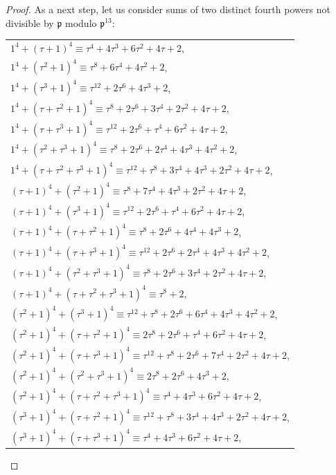 \documentclass[12pt]{article}
\theoremstyle{remark}
\begin{document}
\begin{proof}
As a next step, let us consider sums of two distinct fourth powers not divisible by $\mathfrak{p}$ modulo $\mathfrak{p}^{13}$:
\begin{center}
\begin{tabular}{@{}l@{}}
    $1^4 + (\tau+1)^4 \equiv \tau^4 + 4\tau^3 + 6\tau^2 + 4\tau +2$,\\
    $1^4 + (\tau^2+1)^4 \equiv \tau^8 + 6\tau^4 + 4\tau^2 + 2$,\\
    $1^4 + (\tau^3+1)^4 \equiv \tau^{12} + 2\tau^6 + 4\tau^3 + 2$,\\
    $1^4 + (\tau+\tau^2+1)^4 \equiv \tau^8 + 2\tau^6 + 3\tau^4 + 2\tau^2 + 4\tau + 2$,\\
    $1^4 + (\tau+\tau^3+1)^4 \equiv \tau^{12} + 2\tau^6 + \tau^4 + 6\tau^2 + 4\tau +2$, \\
    $1^4 + (\tau^2+\tau^3+1)^4 \equiv \tau^8+2\tau^6+2\tau^4+4\tau^3+4\tau^2+2$,\\
    $1^4 + (\tau+\tau^2+\tau^3+1)^4 \equiv \tau^{12}+\tau^8+3\tau^4+4\tau^3+2\tau^2+4\tau+2$, \\
    $(\tau+1)^4 + (\tau^2+1)^4 \equiv \tau^8 + 7\tau^4 + 4\tau^3 + 2\tau^2 + 4\tau + 2$, \\
    $(\tau+1)^4 + (\tau^3+1)^4 \equiv \tau^{12} + 2\tau^6 + \tau^4 + 6\tau^2 + 4\tau + 2$, \\
    $(\tau+1)^4 + (\tau+\tau^2+1)^4 \equiv \tau^8 + 2\tau^6 + 4\tau^4 + 4\tau^3 + 2$, \\
    $(\tau+1)^4 + (\tau+\tau^3+1)^4 \equiv \tau^{12}+ 2\tau^6 + 2\tau^4 + 4\tau^3 + 4\tau^2 + 2$, \\
    $(\tau+1)^4 + (\tau^2+\tau^3+1)^4 \equiv \tau^8 + 2\tau^6 + 3\tau^4+2\tau^2+4\tau+2$, \\
    $(\tau+1)^4 + (\tau+\tau^2+\tau^3+1)^4 \equiv \tau^8 + 2$, \\
    $(\tau^2+1)^4 + (\tau^3+1)^4 \equiv \tau^{12}+ \tau^8 + 2\tau^6 + 6\tau^4 + 4\tau^3 + 4\tau^2 + 2$,\\
    $(\tau^2+1)^4 + (\tau+\tau^2+1)^4 \equiv 2\tau^8 + 2\tau^6 + \tau^4 + 6\tau^2 + 4\tau + 2$, \\
    $(\tau^2+1)^4 + (\tau+\tau^3+1)^4 \equiv \tau^{12}+\tau^8+2\tau^6+7\tau^4+2\tau^2+4\tau+2$, \\
    $(\tau^2+1)^4 + (\tau^2+\tau^3+1)^4 \equiv 2\tau^8 + 2\tau^6 + 4\tau^3 + 2$, \\
    $(\tau^2+1)^4 + (\tau+\tau^2+\tau^3+1)^4 \equiv \tau^4+4\tau^3+6\tau^2+4\tau+2$, \\
    $(\tau^3+1)^4 + (\tau+\tau^2+1)^4 \equiv \tau^{12}+\tau^8+3\tau^4+4\tau^3+2\tau^2+4\tau+2$, \\
    $(\tau^3+1)^4 + (\tau+\tau^3+1)^4 \equiv \tau^4+4\tau^3+6\tau^2+4\tau+2$, \\
    

\end{tabular}
\end{center}
\end{proof}
\end{document}
